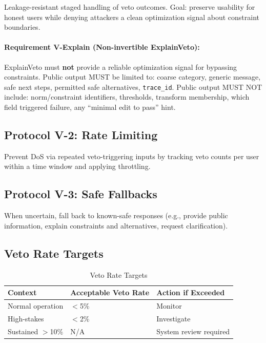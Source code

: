 \documentclass[11pt,letterpaper]{article}
\theoremstyle{definition}
\theoremstyle{remark}
\begin{document}
Leakage-resistant staged handling of veto outcomes. Goal: preserve usability for honest users while denying attackers a clean optimization signal about constraint boundaries.

\paragraph{Requirement V-Explain (Non-invertible ExplainVeto):} ExplainVeto must \textbf{not} provide a reliable optimization signal for bypassing constraints. Public output MUST be limited to: coarse category, generic message, safe next steps, permitted safe alternatives, \texttt{trace\_id}. Public output MUST NOT include: norm/constraint identifiers, thresholds, transform membership, which field triggered failure, any ``minimal edit to pass'' hint.

\subsection{Protocol V-2: Rate Limiting}

Prevent DoS via repeated veto-triggering inputs by tracking veto counts per user within a time window and applying throttling.

\subsection{Protocol V-3: Safe Fallbacks}

When uncertain, fall back to known-safe responses (e.g., provide public information, explain constraints and alternatives, request clarification).

\subsection{Veto Rate Targets}

\begin{table}[h]
\centering
\begin{tabular}{@{}lll@{}}
\toprule
\textbf{Context} & \textbf{Acceptable Veto Rate} & \textbf{Action if Exceeded} \\
\midrule
Normal operation & $<$5\% & Monitor \\
High-stakes & $<$2\% & Investigate \\
Sustained $>$10\% & N/A & System review required \\
\bottomrule
\end{tabular}
\caption{Veto Rate Targets}
\end{table}
\end{document}
